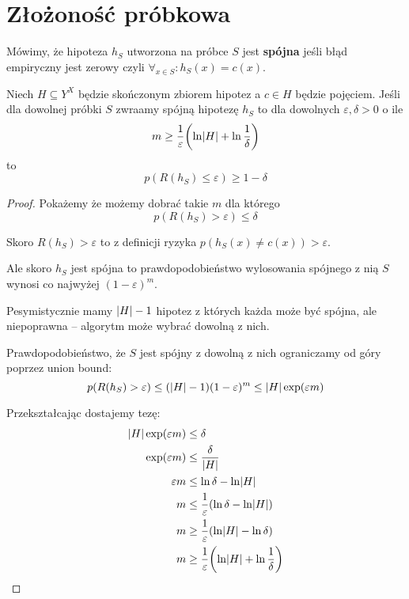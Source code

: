 \section{Złożoność próbkowa}

\begin{definition}
Mówimy, że hipoteza \( h_S \) utworzona na próbce \( S \) jest \textbf{spójna} jeśli 
błąd empiryczny jest zerowy czyli \( \forall_{x \in S} : h_S(x) = c(x) \).
\end{definition}

\begin{theorem}
    Niech \( H \subseteq Y^X \) będzie skończonym zbiorem hipotez a \( c \in H \) będzie pojęciem. Jeśli dla dowolnej próbki \( S \) zwraamy spójną hipotezę \( h_S \) to dla dowolnych \( \varepsilon, \delta > 0 \) o ile
    \[
        m \geq \frac{1}{\varepsilon}\pars{\ln \card{H} + \ln \frac{1}{\delta}}
    \]
    to
    \[
        p(R(h_S) \leq \varepsilon) \geq 1 - \delta
    \]
\end{theorem}
\begin{proof}
    Pokażemy że możemy dobrać takie \( m \) dla którego
    \[
        p(R(h_S) > \varepsilon) \leq \delta
    \]
   
   Skoro \( R(h_S) > \varepsilon \) to z definicji ryzyka \( p(h_S(x) \neq c(x)) > \varepsilon \).
   
   Ale skoro \( h_S \) jest spójna to prawdopodobieństwo wylosowania spójnego z nią \( S \) wynosi co najwyżej \( (1 - \varepsilon)^m \).
    
    Pesymistycznie mamy \( \card{H} - 1 \) hipotez z których każda może być spójna, ale niepoprawna -- algorytm może wybrać dowolną z nich.
    
    Prawdopodobieństwo, że \( S \) jest spójny z dowolną z nich ograniczamy od góry poprzez union bound:
    \[
        p(R(h_S) > \varepsilon) \leq (\card{H} - 1) (1 - \varepsilon)^m \leq \card{H}\exp(\varepsilon m)
    \]
    
    Przekształcając dostajemy tezę:
    \begin{align*}
        \card{H}\exp(\varepsilon m) &\leq \delta \\
        \exp(\varepsilon m) &\leq \frac{\delta}{\card{H}} \\
        \varepsilon m & \leq \ln \delta - \ln \card{H} \\
        m &\leq \frac{1}{\varepsilon}\pars{\ln \delta - \ln \card{H}} \\
        m &\geq \frac{1}{\varepsilon}\pars{\ln \card{H} - \ln \delta} \\
        m &\geq \frac{1}{\varepsilon}\pars{\ln \card{H} + \ln \frac{1}{\delta}}
    \end{align*}
\end{proof}
